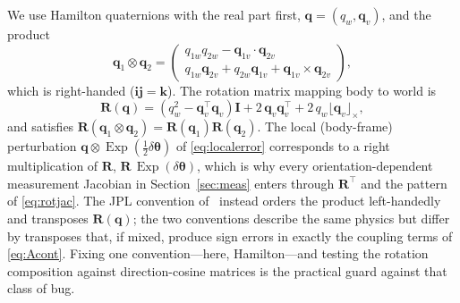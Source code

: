 \documentclass[11pt]{article}
\newcommand{\R}{\mathbf{R}}
\newcommand{\I}{\mathbf{I}}
\newcommand{\bq}{\mathbf{q}}
\newcommand{\skewm}[1]{\lfloor #1 \rfloor_\times}
\newcommand{\dtheta}{\delta\bm{\theta}}
\DeclareMathOperator{\Exp}{Exp}
\begin{document}
We use Hamilton quaternions with the real part first, $\bq=(q_w,\bm q_v)$, and the product
\begin{equation}
  \bq_1\otimes\bq_2 =
  \begin{pmatrix}
    q_{1w}q_{2w} - \bm q_{1v}\!\cdot\!\bm q_{2v} \\[2pt]
    q_{1w}\bm q_{2v} + q_{2w}\bm q_{1v} + \bm q_{1v}\times\bm q_{2v}
  \end{pmatrix},
\end{equation}
which is right-handed ($\bm i\bm j=\bm k$). The rotation matrix mapping body to world is
\begin{equation}
  \R(\bq) = (q_w^2 - \bm q_v^{\!\top}\bm q_v)\I + 2\,\bm q_v\bm q_v^{\!\top}
  + 2\,q_w\skewm{\bm q_v},
\end{equation}
and satisfies $\R(\bq_1\otimes\bq_2)=\R(\bq_1)\R(\bq_2)$. The local (body-frame) perturbation
$\bq\otimes\Exp(\tfrac12\dtheta)$ of \eqref{eq:localerror} corresponds to a right multiplication of
$\R$, $\R\,\Exp(\dtheta)$, which is why every orientation-dependent measurement Jacobian in
Section~\ref{sec:meas} enters through $\R^\top$ and the pattern of \eqref{eq:rotjac}. The JPL convention
of~\cite{trawny2005} instead orders the product left-handedly and transposes $\R(\bq)$; the two
conventions describe the same physics but differ by transposes that, if mixed, produce sign errors in
exactly the coupling terms of \eqref{eq:Acont}. Fixing one convention---here, Hamilton---and testing the
rotation composition against direction-cosine matrices is the practical guard against that class of bug.
\end{document}
